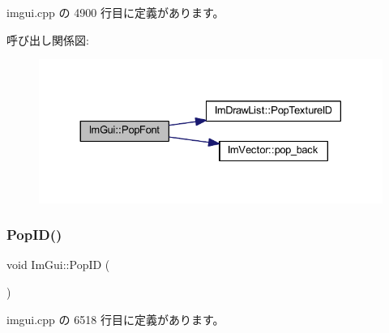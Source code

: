  imgui.\+cpp の 4900 行目に定義があります。

呼び出し関係図\+:\nopagebreak
\begin{figure}[H]
\begin{center}
\leavevmode
\includegraphics[width=330pt]{namespace_im_gui_af66649bc37022bf3cf2496c73af9a499_cgraph}
\end{center}
\end{figure}
\mbox{\label{namespace_im_gui_aba0b2d8f890a5d435ae43d0c4a2d4dd1}} 
\subsubsection{\texorpdfstring{Pop\+I\+D()}{PopID()}}
{\footnotesize\ttfamily void Im\+Gui\+::\+Pop\+ID (\begin{DoxyParamCaption}{ }\end{DoxyParamCaption})}



 imgui.\+cpp の 6518 行目に定義があります。

